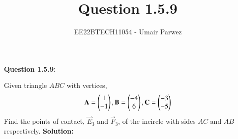 \documentclass[journal,12pt,twocolumn]{IEEEtran}
\theoremstyle{remark}
\begin{document}



\vspace{3cm}

\title{
	Question 1.5.9
}

\author{
	EE22BTECH11054 - Umair Parwez
}	

\maketitle
\newpage


\renewcommand{\thefigure}{\theenumi}
\renewcommand{\thetable}{\theenumi}


\textbf{Question 1.5.9:}

Given triangle $ABC$ with vertices, 
\begin{align}
	\mathbf{A} = \begin{pmatrix}1\\ -1\end{pmatrix}, \mathbf{B} = \begin{pmatrix}-4\\ 6\end{pmatrix}, \mathbf{C} = \begin{pmatrix}-3\\ -5\end{pmatrix}
\end{align}
Find the points of contact, $\vec{E}_3$ and $\vec{F}_3$, of the incircle with sides $AC$ and $AB$ respectively.
\fi
\textbf{Solution:}
\end{document}
